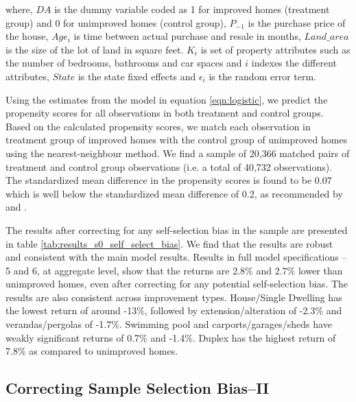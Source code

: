 \documentclass[AEJ,reqno, draftmode]{AEA} %
\begin{document}
where, $DA$ is the dummy variable coded as 1 for improved homes (treatment group) and 0 for unimproved homes (control group), $P_{-1}$ is the purchase price of the house, $Age_i$ is time between actual purchase and resale in months, $Land\_area$ is the size of the lot of land in square feet. $K_i$ is set of property attributes such as the number of bedrooms, bathrooms and car spaces and $i$ indexes the different attributes, $State$ is the state fixed effects and $\epsilon_i$ is the random error term. 
    
Using the estimates from the model in equation \ref{eqn:logistic}, we predict the propensity scores for all observations in both treatment and control groups. Based on the calculated propensity scores, we match each observation in treatment group of improved homes with the control group of unimproved homes using the nearest-neighbour method. We find a sample of 20,366 matched pairs of treatment and control group observations (i.e. a total of 40,732 observations). The standardized mean difference in the propensity scores is found to be 0.07 which is well below the standardized mean difference of 0.2, as recommended by \citet{austin2011optimal} and \citet{wang2013optimal}.

The results after correcting for any self-selection bias in the sample are presented in table \ref{tab:results_s0_self_select_bias}. We find that the results are robust and consistent with the main model results. Results in full model specifications -- 5 and 6, at aggregate level, show that the returns are 2.8\% and 2.7\% lower than unimproved homes, even after correcting for any potential self-selection bias. The results are also consistent across improvement types. House/Single Dwelling has the lowest return of around -13\%, followed by extension/alteration of -2.3\% and verandas/pergolas of -1.7\%. Swimming pool and carports/garages/sheds have weakly significant returns of 0.7\% and -1.4\%. Duplex has the highest return of 7.8\% as compared to unimproved homes.




\restoregeometry




\subsection{Correcting Sample Selection Bias--II}
\end{document}
